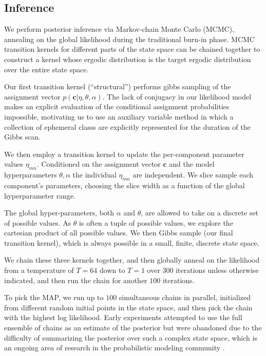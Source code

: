 \documentclass{article}
\renewcommand{\vec}[1]{\mathbf{#1}}
\begin{document}
\subsection{Inference} 
We perform posterior inference via Markov-chain Monte Carlo (MCMC),
annealing on the global likelihood during the traditional burn-in
phase. MCMC transition kernels for different parts of the state space
can be chained together to construct a kernel whose ergodic
distribution is the target ergodic distribution over the entire state space. 

Our first transition kernel (``structural'') performs gibbs sampling 
of the assignment vector $p(\vec{c} | \eta, \theta, \alpha)$. 
The lack of conjugacy in our likelihood model makes an explicit 
evaluation of the conditional assignment probabilities impossible, 
motivating us to use an auxiliary variable method \autocite{Neal2000}
in which a collection of ephemeral classs are explicitly represented
for the duration of the Gibbs scan. 

We then employ a transition kernel to update the per-component
parameter values $\eta_{mn}$. Conditioned on the assignment vector
$\vec{c}$ and the model hyperparameters $\theta, \alpha$ the 
individual $\eta_{mn}$ are independent. We slice sample \autocite{Neal2003}
each component's parameters, choosing the slice width as a function
of the global hyperparameter range. 

The global hyper-parameters, both $\alpha$ and $\theta$, are allowed
to take on a discrete set of possible values. As $\theta$ is often a
tuple of possible values, we explore the cartesian product of all
possible values. We then Gibbs sample (our final transition kernel),
which is always possible in a small, finite, discrete state space.

We chain these three kernels together, and then globally
anneal on the likelihood from a temperature of $T=64$ down to 
$T=1$ over 300 iterations unless otherwise indicated, and
then run the chain for another $100$ iterations. 

To pick the MAP, we run up to $100$ simultaneous chains in parallel,
initialized from different random initial points in the state space,
and then pick the chain with the highest log likelihood. Early
experiments attempted to use the full ensemble of chains as an
estimate of the posterior but were abandoned due to the difficulty of
summarizing the posterior over such a complex state space, which is an
ongoing area of research in the probabilistic modeling community
.
\end{document}
